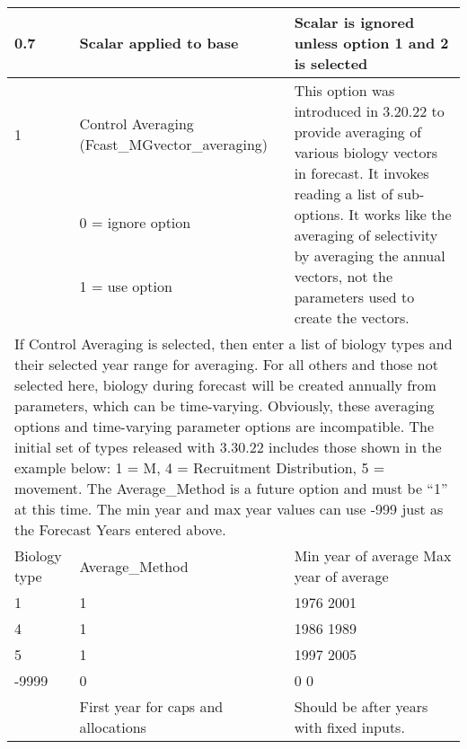 \begin{landscape}
{\begin{longtable}{p{3.2cm} p{7cm} p{10.8cm}}
  \hline
  0.7 \Tstrut & Scalar applied to base & \multirow{1}{1cm}[-0.05cm]{\parbox{11cm}{Scalar is ignored unless option 1 and 2 is selected}} \Bstrut\\

  \hline
  1 & Control Averaging (Fcast\_MGvector\_averaging) & \multirow{4}{1cm}{\parbox{11cm}{This option was introduced in 3.20.22 to provide averaging of various biology vectors in forecast. It invokes reading a list of sub-options. It works like the averaging of selectivity by averaging the annual vectors, not the parameters used to create the vectors.}} \Tstrut\\
    & 0 = ignore option & \\
    & 1 = use option & \\
    & & \\ 

  \hline
  \multicolumn{3}{l}{\multirow{5}{1cm}{\parbox{22cm}{If Control Averaging is selected, then enter a list of biology types and their selected year range for averaging. For all others and those not selected here, biology during forecast will be created annually from parameters, which can be time-varying. Obviously, these averaging options and time-varying parameter options are incompatible. The initial set of types released with 3.30.22 includes those shown in the example below: 1 = M, 4 = Recruitment Distribution, 5 = movement. The Average\_Method is a future option and must be ``1'' at this time. The min year and max year values can use -999 just as the Forecast Years entered above.}}} \\
    & & \\
    & & \\
    & & \\ 
    & & \\

  \hline
  Biology type & Average\_Method & Min year of average \hspace{6mm} Max year of average \Tstrut\\
  1 & 1 & 1976 \hspace{30mm} 2001 \\
  4 & 1 & 1986 \hspace{30mm} 1989 \\
  5 & 1 & 1997 \hspace{30mm} 2005 \\
  -9999 & 0 & 0 \hspace{36mm} 0 \Bstrut\\

  \pagebreak
  2015 \Tstrut & First year for caps and allocations & \multirow{1}{1cm}[-0.10cm]{\parbox{11cm}{Should be after years with fixed inputs.}} \Bstrut\\


\end{longtable}}
\end{landscape}
